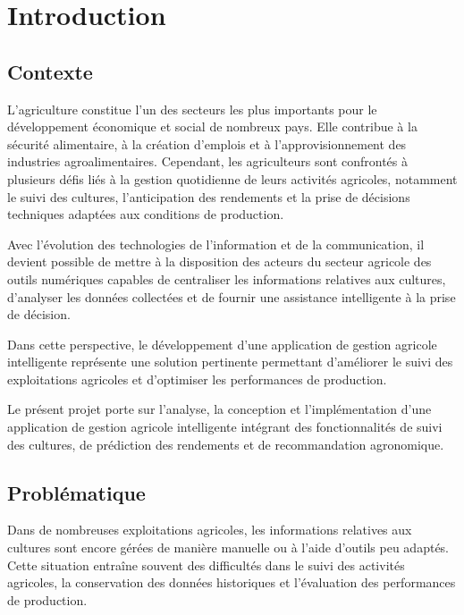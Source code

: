 \documentclass[12pt,a4paper]{report}
\begin{document}
\chapter{Introduction}\label{chapitre-1-introduction}

\section{Contexte}\label{contexte}

L'agriculture constitue l'un des secteurs les plus importants pour le
développement économique et social de nombreux pays. Elle contribue à la
sécurité alimentaire, à la création d'emplois et à l'approvisionnement
des industries agroalimentaires. Cependant, les agriculteurs sont
confrontés à plusieurs défis liés à la gestion quotidienne de leurs
activités agricoles, notamment le suivi des cultures, l'anticipation des
rendements et la prise de décisions techniques adaptées aux conditions
de production.

Avec l'évolution des technologies de l'information et de la
communication, il devient possible de mettre à la disposition des
acteurs du secteur agricole des outils numériques capables de
centraliser les informations relatives aux cultures, d'analyser les
données collectées et de fournir une assistance intelligente à la prise
de décision.

Dans cette perspective, le développement d'une application de gestion
agricole intelligente représente une solution pertinente permettant
d'améliorer le suivi des exploitations agricoles et d'optimiser les
performances de production.

Le présent projet porte sur l'analyse, la conception et l'implémentation
d'une application de gestion agricole intelligente intégrant des
fonctionnalités de suivi des cultures, de prédiction des rendements et
de recommandation agronomique.

\section{Problématique}\label{probluxe9matique}

Dans de nombreuses exploitations agricoles, les informations relatives
aux cultures sont encore gérées de manière manuelle ou à l'aide d'outils
peu adaptés. Cette situation entraîne souvent des difficultés dans le
suivi des activités agricoles, la conservation des données historiques
et l'évaluation des performances de production.
\end{document}
